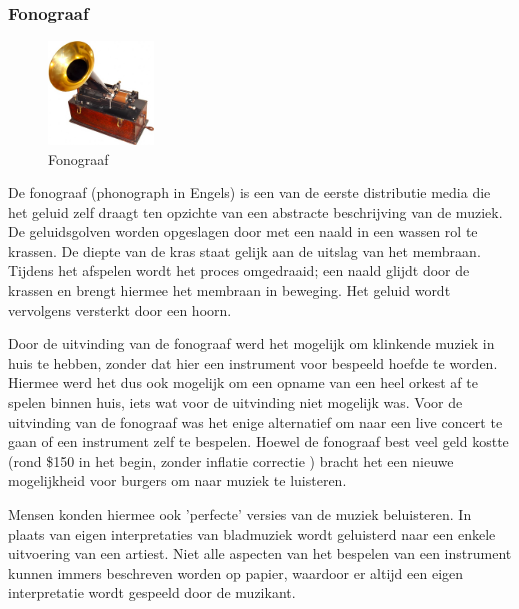 \subsubsection*{Fonograaf}
\begin{figure}
    \centering
    \includegraphics[width=0.25\textwidth]{assets/critical-review/EdisonPhonograph.jpg}
    \caption{Fonograaf}
    \label{fig:critical-review:phonograph}
\end{figure}

De fonograaf (phonograph in Engels) is een van de eerste distributie media die het geluid zelf draagt ten opzichte van een abstracte beschrijving van de muziek. De geluidsgolven worden opgeslagen door met een naald in een wassen rol te krassen. De diepte van de kras staat gelijk aan de uitslag van het membraan. Tijdens het afspelen wordt het proces omgedraaid; een naald glijdt door de krassen en brengt hiermee het membraan in beweging. Het geluid wordt vervolgens versterkt door een hoorn.

Door de uitvinding van de fonograaf werd het mogelijk om klinkende muziek in huis te hebben, zonder dat hier een instrument voor bespeeld hoefde te worden. Hiermee werd het dus ook mogelijk om een opname van een heel orkest af te spelen binnen huis, iets wat voor de uitvinding niet mogelijk was. Voor de uitvinding van de fonograaf was het enige alternatief om naar een live concert te gaan of een instrument zelf te bespelen. Hoewel de fonograaf best veel geld kostte (rond \$150 in het begin, zonder inflatie correctie \citep{historyofphonograph}) bracht het een nieuwe mogelijkheid voor  burgers om naar muziek te luisteren.

Mensen konden hiermee ook 'perfecte' versies van de muziek beluisteren. In plaats van eigen interpretaties van bladmuziek wordt geluisterd naar een enkele uitvoering van een artiest. Niet alle aspecten van het bespelen van een instrument kunnen immers beschreven worden op papier, waardoor er altijd een eigen interpretatie wordt gespeeld door de muzikant.

